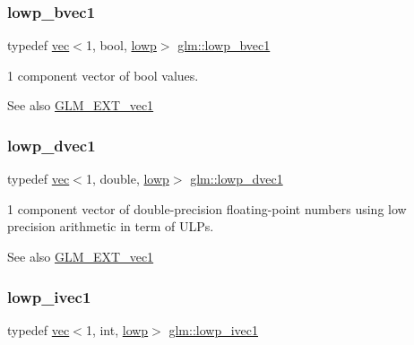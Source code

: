 \subsubsection{\texorpdfstring{lowp\+\_\+bvec1}{lowp\_bvec1}}
{\footnotesize\ttfamily typedef \hyperlink{structglm_1_1vec}{vec}$<$1, bool, \hyperlink{namespaceglm_a36ed105b07c7746804d7fdc7cc90ff25ae161af3fc695e696ce3bf69f7332bc2d}{lowp}$>$ \hyperlink{group__ext__vec1_ga861bf958322f2909514b1256be428490}{glm\+::lowp\+\_\+bvec1}}

1 component vector of bool values.

\begin{DoxySeeAlso}{See also}
\hyperlink{group__ext__vec1}{G\+L\+M\+\_\+\+E\+X\+T\+\_\+vec1} 
\end{DoxySeeAlso}
\mbox{\label{group__ext__vec1_ga4fa455d945a1e3e591689464c0f9090f}} 
\subsubsection{\texorpdfstring{lowp\+\_\+dvec1}{lowp\_dvec1}}
{\footnotesize\ttfamily typedef \hyperlink{structglm_1_1vec}{vec}$<$1, double, \hyperlink{namespaceglm_a36ed105b07c7746804d7fdc7cc90ff25ae161af3fc695e696ce3bf69f7332bc2d}{lowp}$>$ \hyperlink{group__ext__vec1_ga4fa455d945a1e3e591689464c0f9090f}{glm\+::lowp\+\_\+dvec1}}

1 component vector of double-\/precision floating-\/point numbers using low precision arithmetic in term of U\+L\+Ps.

\begin{DoxySeeAlso}{See also}
\hyperlink{group__ext__vec1}{G\+L\+M\+\_\+\+E\+X\+T\+\_\+vec1} 
\end{DoxySeeAlso}
\mbox{\label{group__ext__vec1_ga46adb8a3dcf2312c343a093c3bf372d7}} 
\subsubsection{\texorpdfstring{lowp\+\_\+ivec1}{lowp\_ivec1}}
{\footnotesize\ttfamily typedef \hyperlink{structglm_1_1vec}{vec}$<$1, int, \hyperlink{namespaceglm_a36ed105b07c7746804d7fdc7cc90ff25ae161af3fc695e696ce3bf69f7332bc2d}{lowp}$>$ \hyperlink{group__ext__vec1_ga46adb8a3dcf2312c343a093c3bf372d7}{glm\+::lowp\+\_\+ivec1}}

